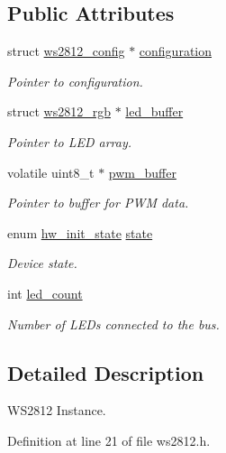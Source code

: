 \subsection*{Public Attributes}
\begin{DoxyCompactItemize}
\item 
struct \hyperlink{structws2812__config}{ws2812\+\_\+config} $\ast$ \hyperlink{structws2812_a4b69cc515557cd305ebfd3372fc09f81}{configuration}
\begin{DoxyCompactList}\small\item\em Pointer to configuration. \end{DoxyCompactList}\item 
struct \hyperlink{structws2812__rgb}{ws2812\+\_\+rgb} $\ast$ \hyperlink{structws2812_a9d672a2d9ea381c7fcd940ba4ebdebe2}{led\+\_\+buffer}
\begin{DoxyCompactList}\small\item\em Pointer to L\+E\+D array. \end{DoxyCompactList}\item 
volatile uint8\+\_\+t $\ast$ \hyperlink{structws2812_a864f88183104cfbdd144cb301870e655}{pwm\+\_\+buffer}
\begin{DoxyCompactList}\small\item\em Pointer to buffer for P\+W\+M data. \end{DoxyCompactList}\item 
enum \hyperlink{hw_8h_a3c02952100e7d051b77cdf060ca0ba9b}{hw\+\_\+init\+\_\+state} \hyperlink{structws2812_a396b295c928e75adc5688c49c832e631}{state}
\begin{DoxyCompactList}\small\item\em Device state. \end{DoxyCompactList}\item 
int \hyperlink{structws2812_aaed6db83ce4a0e8e58b73650f2b4638e}{led\+\_\+count}
\begin{DoxyCompactList}\small\item\em Number of L\+E\+Ds connected to the bus. \end{DoxyCompactList}\end{DoxyCompactItemize}


\subsection{Detailed Description}
W\+S2812 Instance. 

Definition at line 21 of file ws2812.\+h.



